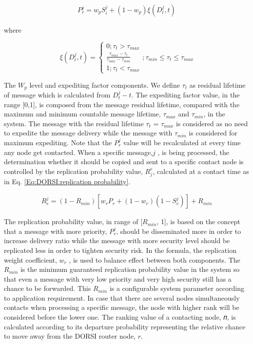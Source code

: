 \begin{eqnarray}
\label{Eq:DORSI:routing algorithm}
{ P }_{ r }^{ j }={ w }_{ p }{ S }_{ i }^{ j }+(1-{ w }_{ p })\xi ({ D }_{ l }^{ j },t)
\end{eqnarray}

where

\begin{equation*}
 \xi ({ D }_{ l }^{ j },t)=\begin{cases} 0;{ \tau  }_{ t }>{ \tau  }_{ max } \\ \frac { { \tau  }_{ max }-{ \tau  }_{ t } }{ { \tau  }_{ max }-{ \tau  }_{ min } }  \\ 1;{ \tau  }_{ t }<{ \tau  }_{ max } \end{cases};{ \tau  }_{ min }\le { \tau  }_{ t }\le { \tau  }_{ max } 	
\end{equation*}

The $W_p$ level and expediting factor components.
We define $\tau_t$ as residual lifetime of message which is calculated from $D_t^j - t$. 
The expediting factor value, in the range [0,1], is composed from the message
residual lifetime, compared with the maximum and minimum countable message lifetime, $\tau_{max}$ and $\tau_{min}$, in the system. 
The message with the residual lifetime $\tau_t$ = $\tau_{max}$ is considered as no need to expedite the message delivery while the message with $\tau_{min}$ is considered for maximum expediting.
Note that the $P_r^j$ value will be recalculated at every time any node get contacted. 
When a specific message,$j$ , is being processed, the determination whether it should be copied and sent to a specific contact node is controlled by the replication probability value, $R_j^e$, calculated at a contact time as in Eq. \ref{Eq:DORSI:replication probability}.


\begin{eqnarray}
\label{Eq:DORSI:replication probability}
{ R }_{ e }^{ j }=(1-{ R }_{ min })[{ w }_{ r }{ P }_{ r }+(1-{ w }_{ r })(1-{ S }_{ e }^{ j })]+{ R }_{ min }
\end{eqnarray}

The replication probability value, in range of [${ R }_{ min }$, 1], is based on the concept that a message with
more priority, $P_r^j$, should be disseminated more in order to increase delivery ratio while the message with more security level should be replicated less in order to tighten security risk. 
In the formula, the replication weight coefficient, $w_r$ , is used to balance effect between both components. 
The ${ R }_{ min }$ is the minimum guaranteed replication probability value in the system so that even a message with very low priority and very high security still has a chance to be forwarded. 
This ${ R }_{ min }$ is a configurable system parameter according to application requirement.
In case that there are several nodes simultaneously contacts when processing a specific message, the node with higher rank will be considered before the lower one. 
The ranking value of a contacting node, 𝑛, is calculated according to its departure probability representing the relative chance to move away from the DORSI router node, $r$.

